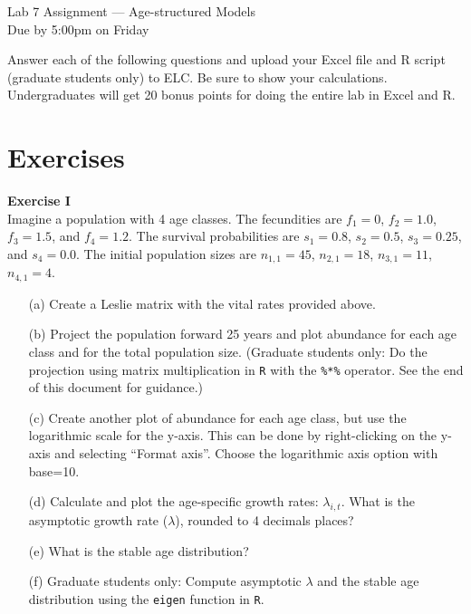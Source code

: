 \documentclass[12pt]{article}\usepackage[]{graphicx}\usepackage[]{xcolor}
\begin{document}
{
  \Large
  \centering
  Lab 7 Assignment --- Age-structured Models \\
  Due by 5:00pm on Friday \par
}

\vspace{12pt}

Answer each of the following questions and upload your Excel file and
R script (graduate students only) to ELC. Be sure to show your
calculations. Undergraduates will get 20 bonus points for doing the entire 
lab in Excel and R. \\ 

\section*{Exercises}


{\bf Exercise I \\}
Imagine a population with 4 age classes. The fecundities are $f_1=0$,
$f_2=1.0$, $f_3=1.5$, and $f_4=1.2$. The survival probabilities are
$s_1=0.8$, $s_2=0.5$, $s_3=0.25$, and $s_4=0.0$. The initial
population sizes are $n_{1,1}=45$, $n_{2,1}=18$, $n_{3,1}=11$, $n_{4,1}=4$.
\begin{itemize}
  \item[(a)] Create a Leslie matrix with the vital rates provided above.
  \item[(b)] Project the population forward 25 years and plot abundance for
    each age class and for the total population size. (Graduate students
    only: Do the projection using matrix multiplication in {\tt R} with
    the \texttt{\%*\%} operator. See the end of this document for
    guidance.)
  \item[(c)] Create another plot of abundance for each age class, but use the
    logarithmic scale for the y-axis. This can be done by right-clicking
    on the y-axis and selecting ``Format axis''. Choose the logarithmic
    axis option with base=10.
  \item[(d)] Calculate and plot the age-specific
    growth rates: $\lambda_{i,t}$. What is the asymptotic growth rate
    ($\lambda$), rounded to 4 decimals places?
  \item[(e)] What is the stable age distribution?
  \item[(f)] Graduate students only: Compute asymptotic $\lambda$ and
    the stable age distribution using the \texttt{eigen} function in {\tt R}.
\end{itemize}
\end{document}
